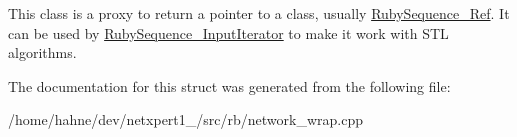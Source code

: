 This class is a proxy to return a pointer to a class, usually \hyperlink{structswig_1_1RubySequence__Ref}{Ruby\+Sequence\+\_\+\+Ref}. It can be used by \hyperlink{structswig_1_1RubySequence__InputIterator}{Ruby\+Sequence\+\_\+\+Input\+Iterator} to make it work with S\+TL algorithms. 

The documentation for this struct was generated from the following file\+:\begin{DoxyCompactItemize}
\item 
/home/hahne/dev/netxpert1\+\_/src/rb/network\+\_\+wrap.\+cpp\end{DoxyCompactItemize}

